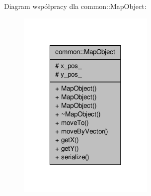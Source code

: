 Diagram współpracy dla common\-:\-:Map\-Object\-:
\nopagebreak
\begin{figure}[H]
\begin{center}
\leavevmode
\includegraphics[width=186pt]{classcommon_1_1MapObject__coll__graph}
\end{center}
\end{figure}

